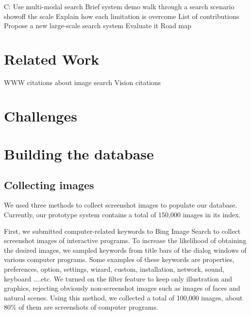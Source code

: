 \documentclass{www2010-submission}
\begin{document}
%

C: Use multi-modal search
    Brief system demo
        walk through a search scenario
        showoff the scale
    Explain how each limitation is overcome
    List of contributions
        Propose a new large-scale search system
        Evaluate it
    Road map

\section{Related Work}
    WWW citations about image search
    Vision citations

\section{Challenges}

\section{Building the database}

\subsection{Collecting images}


We used three methods to collect screenshot images to populate our
database. Currently, our prototype system contains a total of
150,000 images in its index.

First, we submitted computer-related keywords to Bing Image Search
to collect screenshot images of interactive programs. To increase
the likelihood of obtaining the desired images, we sampled
keywords from title bars of the dialog windows of various computer
programs. Some examples of these keywords are properties,
preferences, option, settings, wizard, custom, installation,
network, sound, keyboard ....etc. We turned on the filter feature
to keep only illustration and graphics, rejecting obviously
non-screenshot images such as images of faces and natural scenes.
Using this method, we collected a total of 100,000 images, about
80\% of them are screenshots of computer programs.
\end{document}
